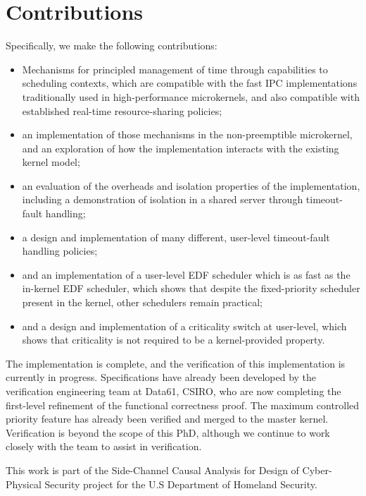 \section{Contributions}

Specifically, we make the following contributions:

\begin{itemize}
    \item Mechanisms for principled management of time through capabilities to scheduling contexts,
        which are compatible with the fast IPC implementations traditionally used in high-performance
        microkernels, and also compatible with established real-time resource-sharing policies;
    \item an implementation of those mechanisms in the non-preemptible \selfour microkernel, and an
        exploration of how the implementation interacts with the existing kernel model;
    \item an evaluation of the overheads and isolation properties of the implementation, including
        a demonstration of isolation in a shared server through timeout-fault handling;
    \item a design and implementation of many different, user-level timeout-fault handling policies;
    \item and an implementation of a user-level \gls{EDF} scheduler which is as fast as the
        \litmus in-kernel EDF scheduler, which shows that despite the fixed-priority scheduler
        present in the kernel, other schedulers remain practical;
    \item and a design and implementation of a criticality switch at user-level, which shows that
        criticality is not required to be a kernel-provided property.
\end{itemize}

The implementation is complete, and the verification of this implementation is currently in progress.
Specifications have already been developed by the verification engineering team at Data61, CSIRO,
who are now completing the first-level refinement of the functional correctness proof.
The maximum controlled priority feature has already been verified and merged to the master kernel. 
Verification is beyond the scope of this PhD, although we continue to work closely with
the team to assist in verification. 

This work is part of
the Side-Channel Causal Analysis for Design of Cyber-Physical Security project for the U.S
Department of Homeland Security.

